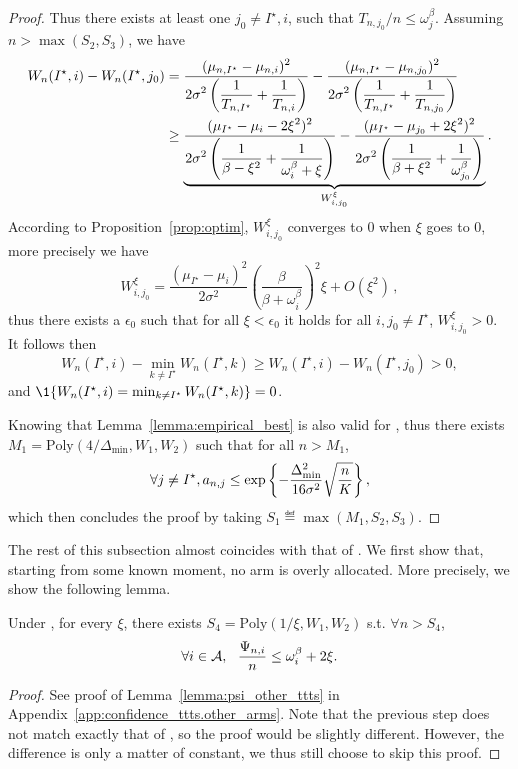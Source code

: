 \begin{proof}
    Thus there exists at least one $j_0\neq I^\star,i$, such that $T_{n,j_0}/n \leq \omega_j^\beta$. Assuming $n>\max(S_2,S_3)$, we have
    \begin{align*}
        W_n(I^\star,i)-W_n(I^\star,j_0) 
        &= \frac{\displaystyle (\mu_{n,I^\star}-\mu_{n,i})^2}{\displaystyle 2\sigma^2\left(\frac{1}{T_{n,I^\star}}+\frac{1}{T_{n,i}}\right)} - \frac{\displaystyle (\mu_{n,I^\star}-\mu_{n,j_0})^2}{\displaystyle 2\sigma^2\left(\frac{1}{T_{n,I^\star}}+\frac{1}{T_{n,j_0}}\right)}\\
        &\geq \underbrace{\frac{\displaystyle (\mu_{I^\star}-\mu_{i}-2\xi^2)^2}{\displaystyle 2\sigma^2\left(\frac{1}{\beta-\xi^2}+\frac{1}{\omega_i^\beta+\xi}\right)} - \frac{\displaystyle (\mu_{I^\star}-\mu_{j_0}+2\xi^2)^2}{\displaystyle 2\sigma^2\left(\frac{1}{\beta+\xi^2}+\frac{1}{\omega_{j_0}^\beta}\right)}}_{W_{i,j_0}^\xi}.
    \end{align*}
    According to Proposition~\ref{prop:optim}, $W_{i,j_0}^\xi$ converges to 0 when $\xi$ goes to 0, more precisely we have 
    \[W_{i,j_0}^\xi = \frac{(\mu_{I^\star}-\mu_{i})^2}{2\sigma^2} \left(\frac{\beta}{\beta +\omega_i^\beta}\right)^2 \xi + O(\xi^2)\,,
    \]
    thus there exists a $\epsilon_0$ such that for all $\xi<\epsilon_0$ it holds for all $i,j_0\neq I^\star$, $W_{i, j_0}^\xi>0$. It follows then
    \[
        W_n(I^\star,i)-\min_{k\neq I^\star}W_n(I^\star,k) \geq W_n(I^\star,i)-W_n(I^\star,j_0) > 0,
    \]
    and $\1\{W_n(I^\star,i)=\min_{k\neq I^\star} W_n(I^\star,k)\}=0$.
    
    Knowing that Lemma~\ref{lemma:empirical_best} is also valid for \TCC, thus there exists $M_1 = \text{Poly}(4/\Delta_{\min},W_1,W_2)$ such that for all $n>M_1$,
    \[
        \forall j \neq I^\star, a_{n,j} \leq \exp\left\{-\frac{\Delta_{\text{min}}^2}{16\sigma^2}\sqrt{\frac{n}{K}}\right\},
    \]
    which then concludes the proof by taking $S_1\eqdef\max(M_1,S_2,S_3)$.
\end{proof}

The rest of this subsection almost coincides with that of \TTTS. We first show that, starting from some known moment, no arm is overly allocated. More precisely, we show the following lemma.

\begin{lemma}\label{lemma:psi_other_t3c}
    Under \TCC, for every $\xi$, there exists $S_4 = \text{Poly}(1/\xi,W_1,W_2)$ s.t. $\forall n > S_4$,
    \[
        \forall i \in \mathcal{A}, \ \ \frac{\Psi_{n,i}}{n} \leq \omega_{i}^\beta + 2\xi.
    \]
\end{lemma}

\begin{proof}
    See proof of Lemma~\ref{lemma:psi_other_ttts} in Appendix~\ref{app:confidence_ttts.other_arms}. Note that the previous step does not match exactly that of \TTTS, so the proof would be slightly different. However, the difference is only a matter of constant, we thus still choose to skip this proof.
\end{proof}

